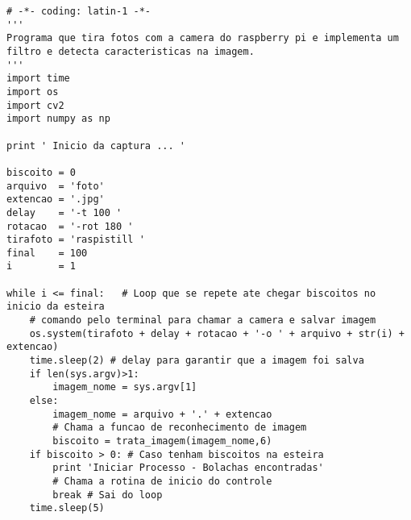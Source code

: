 \lstset{language=Python}
\begin{lstlisting}
# -*- coding: latin-1 -*-
'''
Programa que tira fotos com a camera do raspberry pi e implementa um
filtro e detecta caracteristicas na imagem.
'''
import time
import os
import cv2
import numpy as np

print ' Inicio da captura ... '

biscoito = 0
arquivo  = 'foto'
extencao = '.jpg'
delay    = '-t 100 '
rotacao  = '-rot 180 '
tirafoto = 'raspistill '
final    = 100
i        = 1

while i <= final:   # Loop que se repete ate chegar biscoitos no inicio da esteira
    # comando pelo terminal para chamar a camera e salvar imagem
    os.system(tirafoto + delay + rotacao + '-o ' + arquivo + str(i) + extencao)
    time.sleep(2) # delay para garantir que a imagem foi salva
    if len(sys.argv)>1:
        imagem_nome = sys.argv[1]
    else:
        imagem_nome = arquivo + '.' + extencao
        # Chama a funcao de reconhecimento de imagem
        biscoito = trata_imagem(imagem_nome,6) 
    if biscoito > 0: # Caso tenham biscoitos na esteira
        print 'Iniciar Processo - Bolachas encontradas'
        # Chama a rotina de inicio do controle
        break # Sai do loop
    time.sleep(5)
\end{lstlisting}

